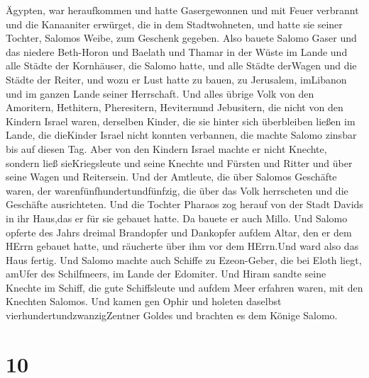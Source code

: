 Ägypten, war heraufkommen und hatte Gasergewonnen und mit Feuer
verbrannt und die Kanaaniter erwürget, die in dem Stadtwohneten, und
hatte sie seiner Tochter, Salomos Weibe, zum Geschenk gegeben.
 Also bauete Salomo Gaser und das niedere Beth-Horon
 und Baelath und Thamar in der Wüste im Lande 
und alle Städte der Kornhäuser, die Salomo hatte, und alle Städte
derWagen und die Städte der Reiter, und wozu er Lust hatte zu bauen, zu
Jerusalem, imLibanon und im ganzen Lande seiner Herrschaft.
 Und alles übrige Volk von den Amoritern, Hethitern,
Pheresitern, Heviternund Jebusitern, die nicht von den Kindern Israel
waren,  derselben Kinder, die sie hinter sich überbleiben
ließen im Lande, die dieKinder Israel nicht konnten verbannen, die
machte Salomo zinsbar bis auf diesen Tag.  Aber von den
Kindern Israel machte er nicht Knechte, sondern ließ sieKriegsleute und
seine Knechte und Fürsten und Ritter und über seine Wagen und
Reitersein.  Und der Amtleute, die über Salomos Geschäfte
waren, der warenfünfhundertundfünfzig, die über das Volk herrscheten und
die Geschäfte ausrichteten.  Und die Tochter Pharaos zog
herauf von der Stadt Davids in ihr Haus,das er für sie gebauet hatte. Da
bauete er auch Millo.  Und Salomo opferte des Jahrs dreimal
Brandopfer und Dankopfer aufdem Altar, den er dem HErrn gebauet hatte,
und räucherte über ihm vor dem HErrn.Und ward also das Haus fertig.
 Und Salomo machte auch Schiffe zu Ezeon-Geber, die bei
Eloth liegt, amUfer des Schilfmeers, im Lande der Edomiter.
 Und Hiram sandte seine Knechte im Schiff, die gute
Schiffsleute und aufdem Meer erfahren waren, mit den Knechten Salomos.
 Und kamen gen Ophir und holeten daselbst
vierhundertundzwanzigZentner Goldes und brachten es dem Könige Salomo.

\hypertarget{section-9}{%
\section{10}\label{section-9}}

